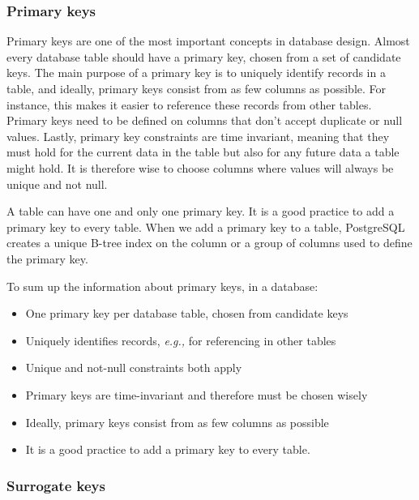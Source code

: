 \documentclass[11pt]{article}
\begin{document}
    \subsubsection{Primary keys} \label{subsubsec:primary_keys}

    Primary keys are one of the most important concepts in database design.
    Almost every database table should have a primary key, chosen from a set of candidate keys.
    The main purpose of a primary key is to uniquely identify records in a table, and ideally, primary keys consist from as few columns as possible.
    For instance, this makes it easier to reference these records from other tables.
    Primary keys need to be defined on columns that don't accept duplicate or null values.
    Lastly, primary key constraints are time invariant, meaning that they must hold for the current data in the table \textemdash but also for any future data a table might hold.
    It is therefore wise to choose columns where values will always be unique and not null.

    A table can have one and only one primary key.
    It is a good practice to add a primary key to every table.
    When we add a primary key to a table, PostgreSQL creates a unique B-tree index on the column or a group of columns used to define the primary key.\cite{ThePostgreSQLGlobalDevelopmentGroup2019a}

    To sum up the information about primary keys, in a database:

    \begin{itemize}
        \item One primary key per database table, chosen from candidate keys
        \item Uniquely identifies records, \textit{e.g.,} for referencing in other tables
        \item Unique and not-null constraints both apply
        \item Primary keys are time-invariant and therefore must be chosen wisely
        \item Ideally, primary keys consist from as few columns as possible
        \item It is a good practice to add a primary key to every table.
    \end{itemize}

    \subsubsection{Surrogate keys} \label{subsubsec:surrogate_keys}
\end{document}
